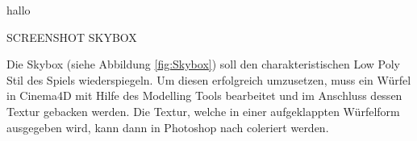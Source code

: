 hallo



SCREENSHOT SKYBOX

Die Skybox (siehe Abbildung \ref{fig:Skybox}) soll den charakteristischen Low Poly Stil des Spiels wiederspiegeln. Um diesen erfolgreich umzusetzen, muss ein Würfel in Cinema4D mit Hilfe des Modelling Tools bearbeitet und im Anschluss dessen Textur gebacken werden. Die Textur, welche in einer aufgeklappten Würfelform ausgegeben wird, kann dann in Photoshop nach coleriert werden.